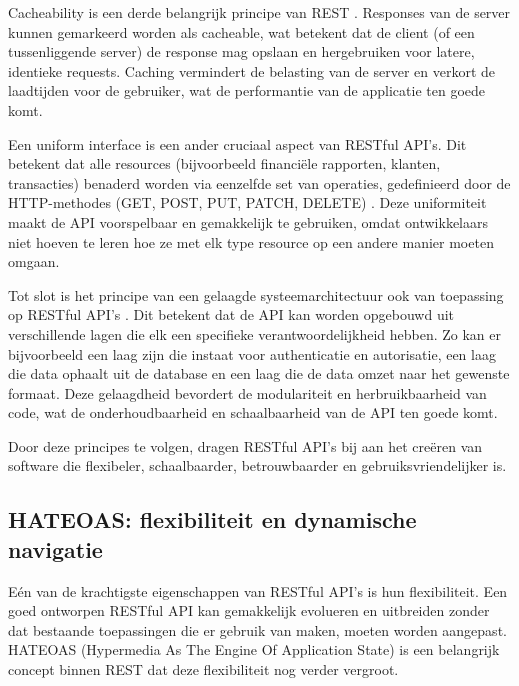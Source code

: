 \bigskip

Cacheability is een derde belangrijk principe van REST  \autocite{Fielding2000}. Responses van de server kunnen gemarkeerd worden als cacheable, wat betekent dat de client (of een tussenliggende server) de response mag opslaan en hergebruiken voor latere, identieke requests. Caching vermindert de belasting van de server en verkort de laadtijden voor de gebruiker, wat de performantie van de applicatie ten goede komt.

\bigskip

Een uniform interface is een ander cruciaal aspect van RESTful API's. Dit betekent dat alle resources (bijvoorbeeld financiële rapporten, klanten, transacties) benaderd worden via eenzelfde set van operaties, gedefinieerd door de HTTP-methodes (GET, POST, PUT, PATCH, DELETE) \autocite{Fielding2000}. Deze uniformiteit maakt de API voorspelbaar en gemakkelijk te gebruiken, omdat ontwikkelaars niet hoeven te leren hoe ze met elk type resource op een andere manier moeten omgaan.

\bigskip

Tot slot is het principe van een gelaagde systeemarchitectuur ook van toepassing op RESTful API's \autocite{Fielding2000}. Dit betekent dat de API kan worden opgebouwd uit verschillende lagen die elk een specifieke verantwoordelijkheid hebben. Zo kan er bijvoorbeeld een laag zijn die instaat voor authenticatie en autorisatie, een laag die data ophaalt uit de database en een laag die de data omzet naar het gewenste formaat. Deze gelaagdheid bevordert de modulariteit en herbruikbaarheid van code, wat de onderhoudbaarheid en schaalbaarheid van de API ten goede komt.

\bigskip

Door deze principes te volgen, dragen RESTful API's bij aan het creëren van software die flexibeler, schaalbaarder, betrouwbaarder en gebruiksvriendelijker is. 

\subsection{HATEOAS: flexibiliteit en dynamische navigatie}

Eén van de krachtigste eigenschappen van RESTful API's is hun flexibiliteit. Een goed ontworpen RESTful API kan gemakkelijk evolueren en uitbreiden zonder dat bestaande toepassingen die er gebruik van maken, moeten worden aangepast. HATEOAS (Hypermedia As The Engine Of Application State) is een belangrijk concept binnen REST dat deze flexibiliteit nog verder vergroot.

